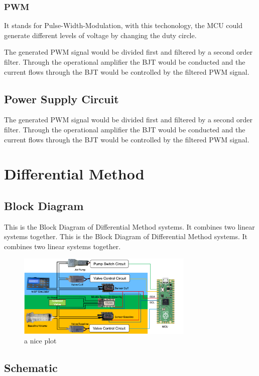 \subsubsection{PWM}
It stands for Pulse-Width-Modulation, with this techonology, the MCU could generate different levels of voltage by changing the duty circle. 

The generated PWM signal would be divided first and filtered by a second order filter. Through the operational amplifier the BJT would be conducted and the current flows through the BJT would be controlled by the filtered PWM signal.



\subsection{Power Supply Circuit}
The generated PWM signal would be divided first and filtered by a second order filter. Through the operational amplifier the BJT would be conducted and the current flows through the BJT would be controlled by the filtered PWM signal.

\section{Differential Method}
\subsection{Block Diagram}
This is the Block Diagram of Differential Method systems. It combines two linear systems together.
This is the Block Diagram of Differential Method systems. It combines two linear systems together.
\begin{figure}[h]
    \centering 
    \captionsetup{justification=centering}
    \includegraphics[width=0.75\textwidth]{img/blockdiagram_diff.png}
    \caption{a nice plot}
    \label{fig:mesh1}
\end{figure}

\subsection{Schematic}

